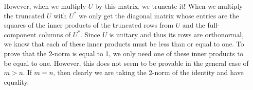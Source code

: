 \documentclass[12pt]{article}
\numberwithin{equation}{section}
\begin{document}
\begin{enumerate}
However, when we multiply $U$ by this matrix, we truncate it! When we multiply the truncated $U$ with $U^*$ we only get the diagonal matrix whose entries are the squares of the inner products of the truncated rows from $U$ and the full-component columns of $U^*$. Since $U$ is unitary and thus its rows are orthonormal, we know that each of these inner products must be less than or equal to one. To prove that the 2-norm is equal to 1, we only need one of these inner products to be equal to one. However, this does not seem to be provable in the general case of $m>n.$ If $m=n$, then clearly we are taking the 2-norm of the identity and have equality.


\end{enumerate}
\end{document}
